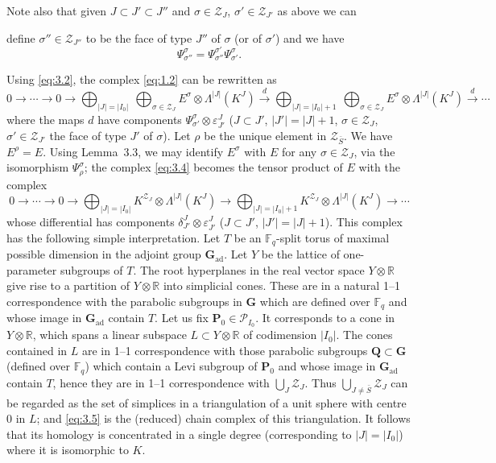 \documentclass[10pt,a4paper]{article}
\theoremstyle{plain}
\theoremstyle{definition}
\theoremstyle{remark}
\newcommand{\R}{\mathbb{R}}
\newcommand{\F}{\mathbb{F}}
\newcommand{\cP}{\mathcal{P}}
\newcommand{\cZ}{\mathcal{Z}}
\newcommand{\bG}{\mathbf{G}}
\newcommand{\bP}{\mathbf{P}}
\newcommand{\bQ}{\mathbf{Q}}
\begin{document}
Note also that given $J \subset J' \subset J''$ and $\sigma \in \cZ_J$, $\sigma' \in \cZ_{J'}$ as above we can

\newpage
\noindent define $\sigma'' \in \cZ_{J''}$ to be the face of type $J''$ of $\sigma$ (or of $\sigma'$) and we have
\begin{equation*}
\Psi_{\sigma''}^{\sigma} = \Psi_{\sigma''}^{\sigma'}\Psi_{\sigma'}^{\sigma}.
\end{equation*}

Using \eqref{eq:3.2}, the complex \eqref{eq:1.2} can be rewritten as
\begin{equation}\tag{3.4}\label{eq:3.4}
0 \to \cdots \to 0 \to
\bigoplus_{|J|=|I_0|}\ \bigoplus_{\sigma \in \cZ_J} E^\sigma \otimes \Lambda^{|J|}(K^J)
\xrightarrow{d} \bigoplus_{|J|=|I_0|+1}\ \bigoplus_{\sigma \in \cZ_J} E^\sigma \otimes \Lambda^{|J|}(K^J)
\xrightarrow{d} \cdots
\end{equation}
where the maps $d$ have components $\Psi_{\sigma'}^{\sigma} \otimes \varepsilon_{J'}^{J}$ ($J \subset J'$, $|J'| = |J|+1$, $\sigma \in \cZ_J$, $\sigma' \in \cZ_{J'}$ the face of type $J'$ of $\sigma$). Let $\rho$ be the unique element in $\cZ_{\bar S}$. We have $E^\rho = E$. Using Lemma~3.3, we may identify $E^\sigma$ with $E$ for any $\sigma \in \cZ_J$, via the isomorphism $\Psi_{\rho}^{\sigma}$; the complex \eqref{eq:3.4} becomes the tensor product of $E$ with the complex
\begin{equation}\tag{3.5}\label{eq:3.5}
0 \to \cdots \to 0 \to
\bigoplus_{|J|=|I_0|} K^{\cZ_J} \otimes \Lambda^{|J|}(K^J)
\to \bigoplus_{|J|=|I_0|+1} K^{\cZ_J} \otimes \Lambda^{|J|}(K^J)
\to \cdots
\end{equation}
whose differential has components $\delta_{J'}^{J} \otimes \varepsilon_{J'}^{J}$ ($J \subset J'$, $|J'| = |J|+1$). This complex has the following simple interpretation. Let $T$ be an $\F_q$-split torus of maximal possible dimension in the adjoint group $\bG_{\mathrm{ad}}$. Let $Y$ be the lattice of one-parameter subgroups of $T$. The root hyperplanes in the real vector space $Y \otimes \R$ give rise to a partition of $Y \otimes \R$ into simplicial cones. These are in a natural 1--1 correspondence with the parabolic subgroups in $\bG$ which are defined over $\F_q$ and whose image in $\bG_{\mathrm{ad}}$ contain $T$. Let us fix $\bP_0 \in \cP_{I_0}$. It corresponds to a cone in $Y \otimes \R$, which spans a linear subspace $L \subset Y \otimes \R$ of codimension $|I_0|$. The cones contained in $L$ are in 1--1 correspondence with those parabolic subgroups $\bQ \subset \bG$ (defined over $\F_q$) which contain a Levi subgroup of $\bP_0$ and whose image in $\bG_{\mathrm{ad}}$ contain $T$, hence they are in 1--1 correspondence with $\bigcup_J \cZ_J$. Thus $\bigcup_{J \ne \bar S} \cZ_J$ can be regarded as the set of simplices in a triangulation of a unit sphere with centre $0$ in $L$; and \eqref{eq:3.5} is the (reduced) chain complex of this triangulation. It follows that its homology is concentrated in a single degree (corresponding to $|J| = |I_0|$) where it is isomorphic to $K$.
\end{document}
